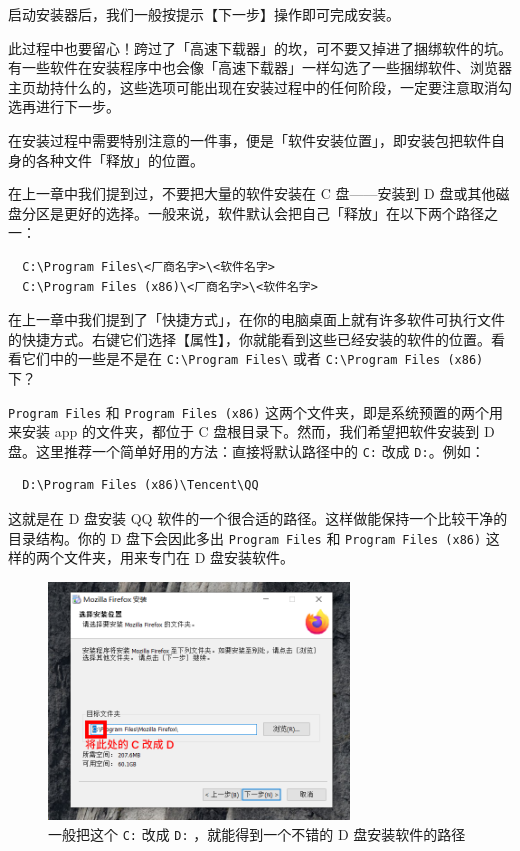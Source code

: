 启动安装器后，我们一般按提示【下一步】操作即可完成安装。

\begin{note}
  此过程中也要留心！跨过了「高速下载器」的坎，可不要又掉进了捆绑软件的坑。有一些软件在安装程序中也会像「高速下载器」一样勾选了一些捆绑软件、浏览器主页劫持什么的，这些选项可能出现在安装过程中的任何阶段，一定要注意取消勾选再进行下一步。
\end{note}

在安装过程中需要特别注意的一件事，便是「软件安装位置」，即安装包把软件自身的各种文件「释放」的位置。

在上一章中我们提到过，不要把大量的软件安装在 C 盘——安装到 D 盘或其他磁盘分区是更好的选择。一般来说，软件默认会把自己「释放」在以下两个路径之一：

\begin{verbatim}
  C:\Program Files\<厂商名字>\<软件名字>
  C:\Program Files (x86)\<厂商名字>\<软件名字>
\end{verbatim}

在上一章中我们提到了「快捷方式」，在你的电脑桌面上就有许多软件可执行文件的快捷方式。右键它们选择【属性】，你就能看到这些已经安装的软件的位置。看看它们中的一些是不是在 \verb|C:\Program Files\| 或者 \verb|C:\Program Files (x86)| 下？

\verb|Program Files| 和 \verb|Program Files (x86)| 这两个文件夹，即是系统预置的两个用来安装 app 的文件夹，都位于 C 盘根目录下。然而，我们希望把软件安装到 D 盘。这里推荐一个简单好用的方法：直接将默认路径中的 \verb|C:| 改成 \verb|D:|。例如：

\begin{verbatim}
  D:\Program Files (x86)\Tencent\QQ
\end{verbatim}

这就是在 D 盘安装 QQ 软件的一个很合适的路径。这样做能保持一个比较干净的目录结构。你的 D 盘下会因此多出 \verb|Program Files| 和 \verb|Program Files (x86)| 这样的两个文件夹，用来专门在 D 盘安装软件。

\begin{figure}[htb!]
  \centering
  \includegraphics[width=8cm]{assets/Change_C_to_D.png}
  \caption{一般把这个 \texttt{C:} 改成 \texttt{D:} ，就能得到一个不错的 D 盘安装软件的路径}
  \label{change-c-to-d}
\end{figure}

